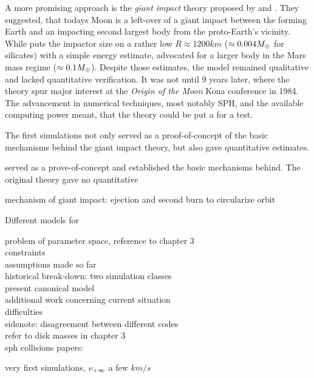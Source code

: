 A more promising approach is the \emph{giant impact} theory proposed by \cite{1975Icar...24..504H} and \cite{1976LPI.....7..120C}. They suggested, that todays Moon is a left-over of a giant impact between the forming Earth and an impacting second largest body from the proto-Earth's vicinity. While \cite{1975Icar...24..504H} puts the impactor size on a rather low $R \approx 1200km$ ($\approx 0.004 M_{\oplus}$ for silicates) with a simple energy estimate, \cite{1976LPI.....7..120C} advocated for a larger body in the Mars mass regime ($\approx 0.1 M_{\oplus}$). Despite those estimates, the model remained qualitative and lacked quantitative verification. It was not until 9 years later, where the theory spur major interest at the \emph{Origin of the Moon} Kona conference in 1984. The advancement in numerical techniques, most notably SPH, and the available computing power meant, that the theory could be put a for a test. 

The first simulations \citep{Benz:1985p1755, Benz:1989p1893, Cameron:2000p1854} not only served as a proof-of-concept of the basic mechanisms behind the giant impact theory, but also gave quantitative estimates. 

served as a prove-of-concept and established the basic mechanisms behind. The original theory gave no quantitative 



mechanism of giant impact: ejection and second burn to circularize orbit


Different models for 

problem of parameter space, reference to chapter 3\\
constraints\\
assumptions made so far\\
historical break-down: two simulation classes\\
present canonical model\\
additional work concerning
current situation\\

difficulties\\

sidenote: disagreement between different codes\\


refer to disk masses in chapter 3\\

sph collisions papers:


\citep{Benz:1985p1755}
very first simulations, $v_{+\infty}$ a few $km/s$

